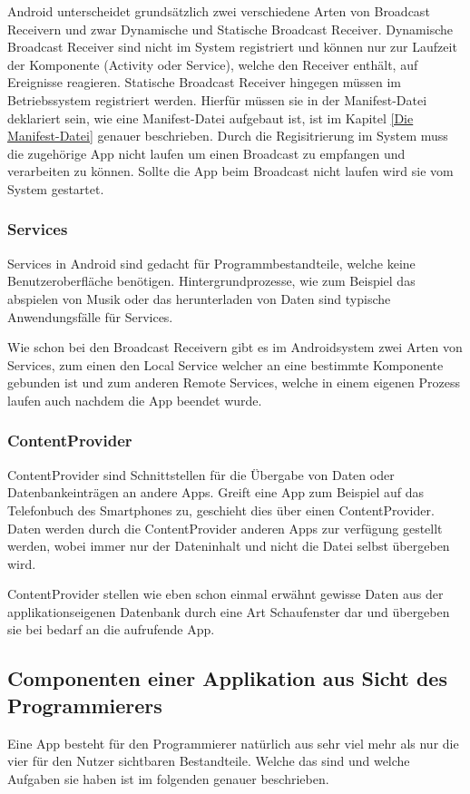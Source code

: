 Android unterscheidet grunds\"atzlich zwei verschiedene Arten von Broadcast Receivern und zwar Dynamische und Statische Broadcast Receiver. Dynamische Broadcast Receiver sind nicht im System registriert und k\"onnen nur zur Laufzeit der Komponente (Activity oder Service), welche den Receiver enth\"alt, auf Ereignisse reagieren. Statische Broadcast Receiver hingegen m\"ussen im Betriebssystem registriert werden. Hierf\"ur m\"ussen sie in der Manifest-Datei deklariert sein, wie eine Manifest-Datei aufgebaut ist, ist im Kapitel \ref{Die Manifest-Datei} genauer beschrieben. Durch die Regisitrierung im System muss die zugeh\"orige App nicht laufen um einen Broadcast zu empfangen und verarbeiten zu k\"onnen. Sollte die App beim Broadcast nicht laufen wird sie vom System gestartet.

\subsubsection{Services} \label{Services aus Nutzersicht}
Services in Android sind gedacht f\"ur Programmbestandteile, welche keine Benutzeroberfl\"ache ben\"otigen. Hintergrundprozesse, wie zum Beispiel das abspielen von Musik oder das herunterladen von Daten sind typische Anwendungsf\"alle f\"ur Services. 

Wie schon bei den Broadcast Receivern gibt es im Androidsystem zwei Arten von Services, zum einen den Local Service welcher an eine bestimmte Komponente gebunden ist und zum anderen  Remote Services, welche in einem eigenen Prozess laufen auch nachdem die App beendet wurde.

\subsubsection{ContentProvider} \label{ContentProvider aus Nutzersicht}
ContentProvider sind Schnittstellen f\"ur die \"Ubergabe von Daten oder Datenbankeintr\"agen an andere Apps.
Greift eine App zum Beispiel auf das Telefonbuch des Smartphones zu, geschieht dies \"uber einen ContentProvider. Daten werden durch die ContentProvider anderen Apps zur verf\"ugung gestellt werden, wobei immer nur der Dateninhalt und nicht die Datei selbst \"ubergeben wird. \cite{Kuehn12}

ContentProvider stellen wie eben schon einmal erw\"ahnt gewisse Daten aus der applikationseigenen Datenbank durch eine Art Schaufenster dar und \"ubergeben sie bei bedarf an die aufrufende App.

\subsection{Componenten einer Applikation aus Sicht des Programmierers} \label{Componenten einer Applikation aus Sicht des Programmierers}
Eine App besteht f\"ur den Programmierer nat\"urlich aus sehr viel mehr als nur die vier f\"ur den Nutzer sichtbaren Bestandteile. Welche das sind und welche Aufgaben sie haben ist im folgenden genauer beschrieben. \cite{GolemHBAppAusEntwicklerSicht}

